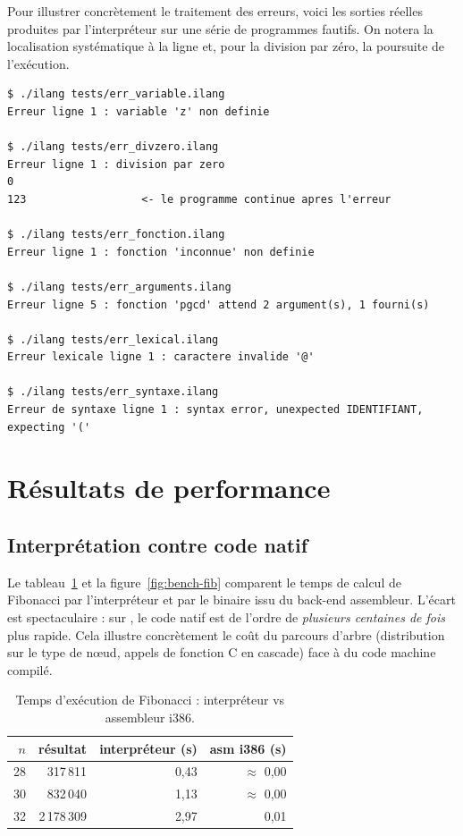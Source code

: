 Pour illustrer concrètement le traitement des erreurs, voici les sorties réelles
produites par l'interpréteur sur une série de programmes fautifs. On notera la
localisation systématique à la ligne et, pour la division par zéro, la poursuite
de l'exécution.

\begin{lstlisting}[style=gram,caption={Sorties réelles sur des programmes fautifs.}]
$ ./ilang tests/err_variable.ilang
Erreur ligne 1 : variable 'z' non definie

$ ./ilang tests/err_divzero.ilang
Erreur ligne 1 : division par zero
0
123                  <- le programme continue apres l'erreur

$ ./ilang tests/err_fonction.ilang
Erreur ligne 1 : fonction 'inconnue' non definie

$ ./ilang tests/err_arguments.ilang
Erreur ligne 5 : fonction 'pgcd' attend 2 argument(s), 1 fourni(s)

$ ./ilang tests/err_lexical.ilang
Erreur lexicale ligne 1 : caractere invalide '@'

$ ./ilang tests/err_syntaxe.ilang
Erreur de syntaxe ligne 1 : syntax error, unexpected IDENTIFIANT, expecting '('
\end{lstlisting}

\section{Résultats de performance}

\subsection{Interprétation contre code natif}

Le tableau~\ref{tab:bench-fib} et la figure~\ref{fig:bench-fib} comparent le temps
de calcul de Fibonacci par l'interpréteur et par le binaire issu du back-end
assembleur. L'écart est spectaculaire : sur , le code natif est de
l'ordre de \emph{plusieurs centaines de fois} plus rapide. Cela illustre
concrètement le coût du parcours d'arbre (distribution sur le type de n\oe ud,
appels de fonction C en cascade) face à du code machine compilé.

\begin{table}[ht]
\centering
\caption{Temps d'exécution de Fibonacci : interpréteur vs assembleur i386.}
\label{tab:bench-fib}
\begin{tabular}{@{}rrrr@{}}
\toprule
$n$ & résultat & interpréteur (s) & asm i386 (s) \\
\midrule
28 & 317\,811   & 0,43 & $\approx$ 0,00 \\
30 & 832\,040   & 1,13 & $\approx$ 0,00 \\
32 & 2\,178\,309 & 2,97 & 0,01 \\
\bottomrule
\end{tabular}
\end{table}

